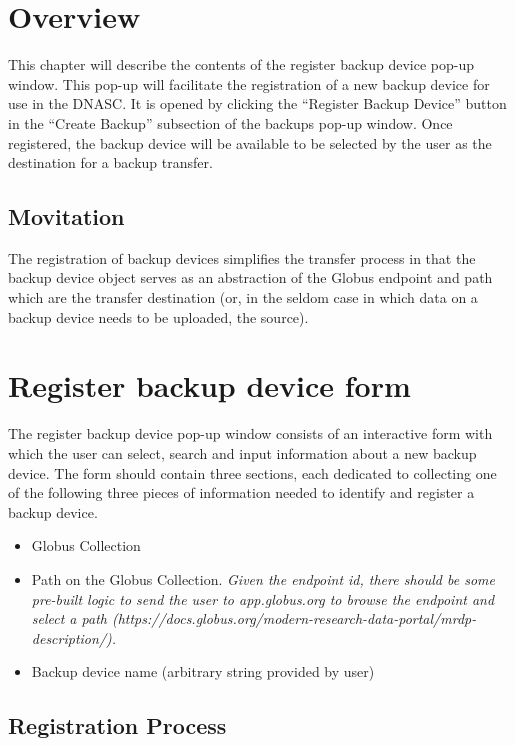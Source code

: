 
\section{Overview}

This chapter will describe the contents of the register backup device pop-up 
window. This pop-up will facilitate the registration of a new backup device
for use in the DNASC. It is opened by clicking the ``Register Backup Device''
button in the ``Create Backup'' subsection of the backups pop-up window.
Once registered, the backup device will be available to be selected by the
user as the destination for a backup transfer.

\subsection{Movitation}
The registration of backup devices simplifies the transfer process in that the 
backup device object serves as an abstraction of the Globus endpoint and path 
which are the transfer destination (or, in the seldom case in which data on 
a backup device needs to be uploaded, the source).

\section{Register backup device form}

The register backup device pop-up window consists of an interactive form with
which the user can select, search and input information about a new backup 
device. The form should contain three sections, each dedicated to collecting 
one of the following three pieces of information needed to identify and register 
a backup device.

\begin{itemize}\itemsep1pt
    \item Globus Collection
    \item Path on the Globus Collection. \emph{Given the endpoint id, there should be some 
    pre-built logic to send the user to app.globus.org to browse the endpoint and 
    select a path 
    (https://docs.globus.org/modern-research-data-portal/mrdp-description/).}
    \item Backup device name (arbitrary string provided by user)
\end{itemize}

\subsection{Registration Process}


